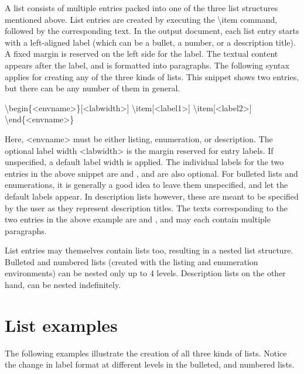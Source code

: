 \documentclass[twoside,openany]{thesis}
\begin{document}
A list consists of multiple entries packed into one of the three list structures mentioned above.
List entries are created by executing the {\ttfamily\textbackslash item} command, followed by the corresponding text.
In the output document, each list entry starts with a left-aligned label (which can be a bullet, a number, or a description title).
A fixed margin is reserved on the left side for the label.
The textual content appears after the label, and is formatted into paragraphs.
The following syntax applies for creating any of the three kinds of lists.
This snippet shows two entries, but there can be any number of them in general.

{\ttfamily
    \textbackslash begin\{<envname>\}[<labwidth>]\linebreak
    \textbackslash item[<label1>]\linebreak
    \textbackslash item[<label2>]\linebreak
    \textbackslash end\{<envname>\}
}

Here, {\ttfamily<envname>} must be either {\ttfamily listing}, {\ttfamily enumeration}, or {\ttfamily description}.
The optional label width {\ttfamily<labwidth>} is the margin reserved for entry labels.
If unspecified, a default label width is applied.
The individual labels for the two entries in the above snippet are {} and {}, and are also optional.
For bulleted lists and enumerations, it is generally a good idea to leave them unspecified, and let the default labels appear.
In description lists however, these are meant to be specified by the user as they represent description titles.
The texts corresponding to the two entries in the above example are {} and {}, and may each contain multiple paragraphs.

List entries may themselves contain lists too, resulting in a nested list structure.
Bulleted and numbered lists (created with the {\ttfamily listing} and {\ttfamily enumeration} environments) can be nested only up to 4 levels.
Description lists on the other hand, can be nested indefinitely.

\section{List examples}\label{sec:List examples}

The following examples illustrate the creation of all three kinds of lists.
Notice the change in label format at different levels in the bulleted, and numbered lists.
\end{document}

